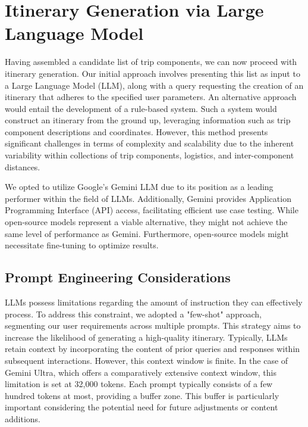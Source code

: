 \documentclass[12pt,a4paper]{report}
\begin{document}
\section{Itinerary Generation via Large Language Model}

Having assembled a candidate list of trip components, we can now proceed with itinerary generation.  Our initial approach involves presenting this list as input to a Large Language Model (LLM), along with a query requesting the creation of an itinerary that adheres to the specified user parameters.  An alternative approach would entail the development of a rule-based system.  Such a system would construct an itinerary from the ground up, leveraging information such as trip component descriptions and coordinates.  However, this method presents significant challenges in terms of complexity and scalability due to the inherent variability within collections of trip components, logistics, and inter-component distances.

We opted to utilize Google's Gemini LLM due to its position as a leading performer within the field of LLMs\citep{geminireport}.  Additionally, Gemini provides Application Programming Interface (API) access, facilitating efficient use case testing.  While open-source models represent a viable alternative, they might not achieve the same level of performance as Gemini.  Furthermore, open-source models might necessitate fine-tuning to optimize results.

\subsection{Prompt Engineering Considerations}

LLMs possess limitations regarding the amount of instruction they can effectively process.  To address this constraint, we adopted a "few-shot" approach, segmenting our user requirements across multiple prompts.  This strategy aims to increase the likelihood of generating a high-quality itinerary.  Typically, LLMs retain context by incorporating the content of prior queries and responses within subsequent interactions.  However, this context window is finite.  In the case of Gemini Ultra, which offers a comparatively extensive context window, this limitation is set at 32,000 tokens.  Each prompt typically consists of a few hundred tokens at most, providing a buffer zone.  This buffer is particularly important considering the potential need for future adjustments or content additions.
\end{document}
